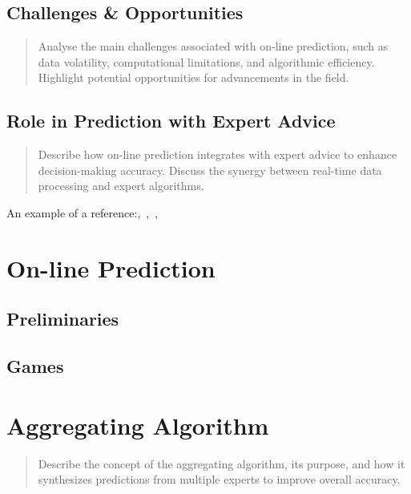 \documentclass[11pt]{article} %
\theoremstyle{plain}
\theoremstyle{definition}
\begin{document}
\subsection{Challenges \& Opportunities}
\begin{quote}
  Analyse the main challenges associated with on-line prediction, such as data volatility, computational limitations, and algorithmic efficiency. Highlight potential opportunities for advancements in the field.
\end{quote}

\subsection{Role in Prediction with Expert Advice}
\begin{quote}
  Describe how on-line prediction integrates with expert advice to enhance decision-making accuracy. Discuss the synergy between real-time data processing and expert algorithms.
\end{quote}

An example of a reference:\newline\cite{kalnishkan:2022},\ \cite{kalnishkan/vyugin:2008},\ \cite{herbster/warmuth:1995},\ \cite{vovk:2001}

\newpage

\section{On-line Prediction}
\subsection{Preliminaries}
\subsection{Games}




\section{Aggregating Algorithm}
\begin{quote}
  Describe the concept of the aggregating algorithm, its purpose, and how it synthesizes predictions from multiple experts to improve overall accuracy.
\end{quote}
\end{document}
